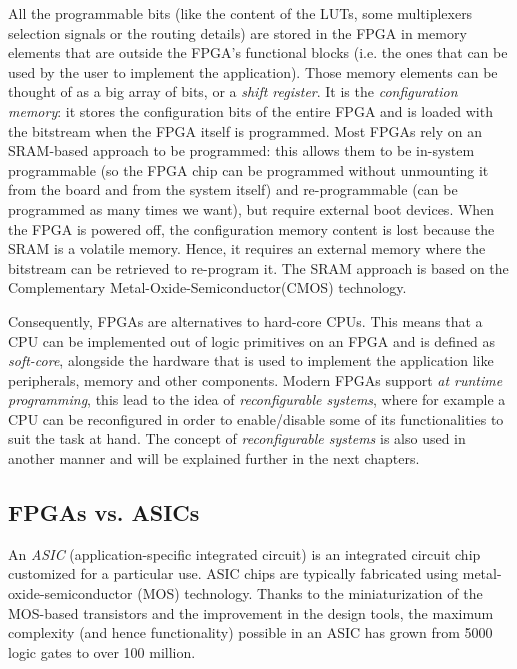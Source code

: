 All the programmable bits (like the content of the LUTs, some multiplexers selection signals or the routing details) are stored in the FPGA in memory elements that are outside the FPGA's functional blocks (i.e. the ones that can be used by the user to implement the application). Those memory elements can be thought of as a big array of bits, or a \textit{shift register}. It is the \textit{configuration memory}: it stores the configuration bits of the entire FPGA and is loaded with the bitstream when the FPGA itself is programmed. Most FPGAs rely on an SRAM-based approach to be programmed: this allows them to be in-system programmable (so the FPGA chip can be programmed without unmounting it from the board and from the system itself) and re-programmable (can be programmed as many times we want), but require external boot devices. When the FPGA is powered off, the configuration memory content is lost because the SRAM is a volatile memory. Hence, it requires an external memory where the bitstream can be retrieved to re-program it. The SRAM approach is based on the Complementary Metal-Oxide-Semiconductor(CMOS) technology.\bigskip

Consequently, FPGAs are alternatives to hard-core CPUs. This means that a CPU can be implemented out of logic primitives on an FPGA and is defined as \textit{soft-core}, alongside the hardware that is used to implement the application like peripherals, memory and other components. Modern FPGAs support \textit{at runtime programming}, this lead to the idea of \textit{reconfigurable systems}, where for example a CPU can be reconfigured in order to enable/disable some of its functionalities to suit the task at hand. The concept of \textit{reconfigurable systems} is also used in another manner and will be explained further in the next chapters.

\subsection{FPGAs vs. ASICs}

An \textit{ASIC} (application-specific integrated circuit) is an integrated circuit chip customized for a particular use. ASIC chips are typically fabricated using metal-oxide-semiconductor (MOS) technology. Thanks to the miniaturization of the MOS-based transistors and the improvement in the design tools, the maximum complexity (and hence functionality) possible in an ASIC has grown from 5000 logic gates to over 100 million. \bigskip

